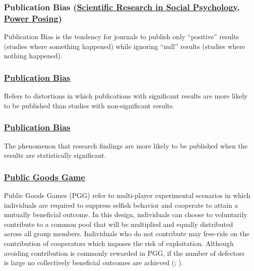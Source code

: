 \documentclass[
  letterpaper,
]{book}
\begin{document}
\subsubsection*{\texorpdfstring{Publication Bias
(\hyperref[def-publicationbias]{Scientific Research in Social
Psychology}, \hyperref[def-publicationbias]{Power
Posing})}{Publication Bias (Scientific Research in Social Psychology, Power Posing)}}\label{publication-bias-scientific-research-in-social-psychology-power-posing}

Publication Bias is the tendency for journals to publish only
``positive'' results (studies where something happened) while ignoring
``null'' results (studies where nothing happened).

\subsubsection*{\texorpdfstring{\hyperref[def-publicationbias]{Publication
Bias}}{Publication Bias}}\label{publication-bias}

Refers to distortions in which publications with significant results are
more likely to be published than studies with non-significant results.

\subsubsection*{\texorpdfstring{\hyperref[def-publicationbias]{Publication
Bias}}{Publication Bias}}\label{publication-bias-1}

The phenomenon that research findings are more likely to be published
when the results are statistically significant.

\subsubsection*{\texorpdfstring{\hyperref[def-pgg]{Public Goods
Game}}{Public Goods Game}}\label{public-goods-game}

Public Goods Games (PGG) refer to multi-player experimental scenarios in
which individuals are required to suppress selfish behavior and
cooperate to attain a mutually beneficial outcome. In this design,
individuals can choose to voluntarily contribute to a common pool that
will be multiplied and equally distributed across all group members.
Individuals who do not contribute may free-ride on the contribution of
cooperators which imposes the risk of exploitation. Although avoiding
contribution is commonly rewarded in PGG, if the number of defectors is
large no collectively beneficial outcomes are achieved
(; ).
\end{document}
